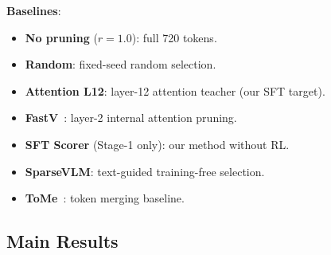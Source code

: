 \documentclass[letterpaper]{article} %
\begin{document}
\textbf{Baselines}:
\begin{itemize}[nosep,leftmargin=*]
\item \textbf{No pruning} ($r{=}1.0$): full 720 tokens.
\item \textbf{Random}: fixed-seed random selection.
\item \textbf{Attention L12}: layer-12 attention teacher (our SFT target).
\item \textbf{FastV}~\citep{fastv2024}: layer-2 internal attention pruning.
\item \textbf{SFT Scorer} (Stage-1 only): our method without RL.
\item \textbf{SparseVLM}: text-guided training-free selection.
\item \textbf{ToMe}~\citep{tome2023}: token merging baseline.
\end{itemize}

\subsection{Main Results}
\end{document}
